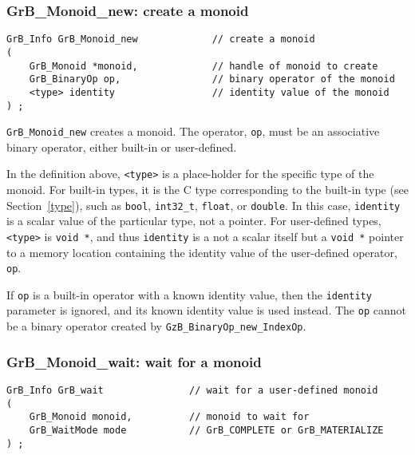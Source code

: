 \documentclass[12pt]{article}
\begin{document}
\subsubsection{{\sf GrB\_Monoid\_new:} create a monoid}
\label{monoid_new}

\begin{mdframed}[userdefinedwidth=6in]
{\footnotesize
\begin{verbatim}
GrB_Info GrB_Monoid_new             // create a monoid
(
    GrB_Monoid *monoid,             // handle of monoid to create
    GrB_BinaryOp op,                // binary operator of the monoid
    <type> identity                 // identity value of the monoid
) ;
\end{verbatim}
} \end{mdframed}

\verb'GrB_Monoid_new' creates a monoid.  The operator, \verb'op', must be an
associative binary operator, either built-in or user-defined.

In the definition above, \verb'<type>' is a place-holder for the specific type
of the monoid.  For built-in types, it is the C type corresponding to the
built-in type (see Section~\ref{type}), such as \verb'bool', \verb'int32_t',
\verb'float', or \verb'double'.  In this case, \verb'identity' is a
scalar value of the particular type, not a pointer.  For
user-defined types, \verb'<type>' is \verb'void *', and thus \verb'identity' is
a not a scalar itself but a \verb'void *' pointer to a memory location
containing the identity value of the user-defined operator, \verb'op'.

If \verb'op' is a built-in operator with a known identity value, then the
\verb'identity' parameter is ignored, and its known identity value is used
instead.
%
The \verb'op' cannot be a binary operator
created by \verb'GzB_BinaryOp_new_IndexOp'.

\subsubsection{{\sf GrB\_Monoid\_wait:} wait for a monoid}
\label{monoid_wait}

\begin{mdframed}[userdefinedwidth=6in]
{\footnotesize
\begin{verbatim}
GrB_Info GrB_wait               // wait for a user-defined monoid
(
    GrB_Monoid monoid,          // monoid to wait for
    GrB_WaitMode mode           // GrB_COMPLETE or GrB_MATERIALIZE
) ;
\end{verbatim}
}\end{mdframed}
\end{document}
